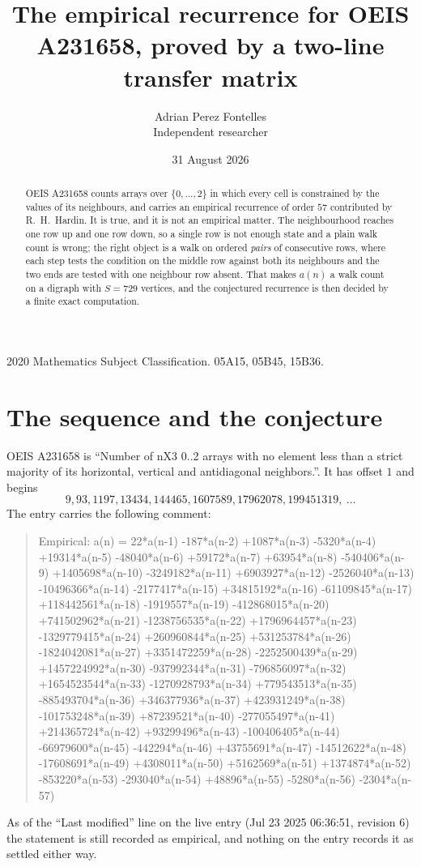 \documentclass[11pt,a4paper]{article}
\title{The empirical recurrence for OEIS A231658, proved by a two-line transfer matrix}
\author{Adrian Perez Fontelles\\ \small Independent researcher}
\date{31 August 2026}
\theoremstyle{plain}
\theoremstyle{definition}
\begin{document}
\maketitle

\begin{abstract}
OEIS A231658 counts arrays over $\{0,\dots,2\}$ in which every cell is constrained by the
values of its neighbours, and carries an empirical recurrence of order $57$ contributed
by R.~H.~Hardin. It is true, and it is not an empirical matter. The neighbourhood reaches one
row up and one row down, so a single row is not enough state and a plain walk count
is wrong; the right object is a walk on ordered \emph{pairs} of consecutive rows, where
each step tests the condition on the middle row against both its neighbours and the two
ends are tested with one neighbour row absent. That makes $a(n)$ a walk count on a digraph
with $S=729$ vertices, and the conjectured recurrence is then decided by a finite exact
computation.
\end{abstract}

\noindent\small 2020 Mathematics Subject Classification. 05A15, 05B45, 15B36.\normalsize

\section{The sequence and the conjecture}

OEIS A231658 is ``Number of nX3 0..2 arrays with no element less than a strict majority of its horizontal, vertical and antidiagonal neighbors.''. It has offset $1$ and begins
\[
9, 93, 1197, 13434, 144465, 1607589, 17962078, 199451319,\ \dots
\]
The entry carries the following comment:
\begin{quote}\small
Empirical: a(n) = 22*a(n-1) -187*a(n-2) +1087*a(n-3) -5320*a(n-4) +19314*a(n-5) -48040*a(n-6) +59172*a(n-7) +63954*a(n-8) -540406*a(n-9) +1405698*a(n-10) -3249182*a(n-11) +6903927*a(n-12) -2526040*a(n-13) -10496366*a(n-14) -2177417*a(n-15) +34815192*a(n-16) -61109845*a(n-17) +118442561*a(n-18) -1919557*a(n-19) -412868015*a(n-20) +741502962*a(n-21) -1238756535*a(n-22) +1796964457*a(n-23) -1329779415*a(n-24) +260960844*a(n-25) +531253784*a(n-26) -1824042081*a(n-27) +3351472259*a(n-28) -2252500439*a(n-29) +1457224992*a(n-30) -937992344*a(n-31) -796856097*a(n-32) +1654523544*a(n-33) -1270928793*a(n-34) +779543513*a(n-35) -885493704*a(n-36) +346377936*a(n-37) +423931249*a(n-38) -101753248*a(n-39) +87239521*a(n-40) -277055497*a(n-41) +214365724*a(n-42) +93299496*a(n-43) -100406405*a(n-44) -66979600*a(n-45) -442294*a(n-46) +43755691*a(n-47) -14512622*a(n-48) -17608691*a(n-49) +4308011*a(n-50) +5162569*a(n-51) +1374874*a(n-52) -853220*a(n-53) -293040*a(n-54) +48896*a(n-55) -5280*a(n-56) -2304*a(n-57)
\end{quote}
As of the ``Last modified'' line on the live entry (Jul 23 2025 06:36:51, revision 6) the statement is
still recorded as empirical, and nothing on the entry records it as settled either way.
\end{document}
